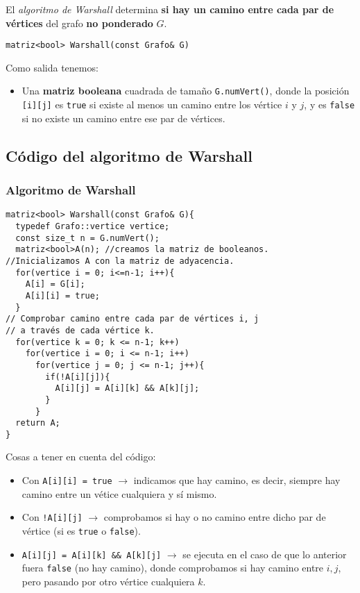 El \textit{algoritmo de Warshall} determina \textbf{si hay un camino entre cada par de vértices} del grafo \textbf{no ponderado} \(G\).

\begin{verbatim}
matriz<bool> Warshall(const Grafo& G)
\end{verbatim}
Como salida tenemos:
\begin{itemize}
  \item Una \textbf{matriz booleana} cuadrada de tamaño \texttt{G.numVert()}, donde la posición \texttt{[i][j]} es \texttt{true} si existe al menos un camino entre los vértice \(i\) y \(j\), y es \texttt{false} si no existe un camino entre ese par de vértices.
\end{itemize}

\subsection{Código del algoritmo de Warshall}
\subsubsection{Algoritmo de Warshall}
\begin{verbatim}
matriz<bool> Warshall(const Grafo& G){
  typedef Grafo::vertice vertice;
  const size_t n = G.numVert();
  matriz<bool>A(n); //creamos la matriz de booleanos.
//Inicializamos A con la matriz de adyacencia.
  for(vertice i = 0; i<=n-1; i++){
    A[i] = G[i];
    A[i][i] = true;
  }
// Comprobar camino entre cada par de vértices i, j
// a través de cada vértice k.
  for(vertice k = 0; k <= n-1; k++)
    for(vertice i = 0; i <= n-1; i++)
      for(vertice j = 0; j <= n-1; j++){
        if(!A[i][j]){
          A[i][j] = A[i][k] && A[k][j];
        }
      }
  return A;
}
\end{verbatim}

Cosas a tener en cuenta del código:
\begin{itemize}
  \item Con \texttt{A[i][i] = true} \(\rightarrow\) indicamos que hay camino, es decir, siempre hay camino entre un vétice cualquiera y sí mismo.
  \item Con \texttt{!A[i][j]} \(\rightarrow\) comprobamos si hay o no camino entre dicho par de vértice (si es \texttt{true} o \texttt{false}).
  \item \texttt{A[i][j] = A[i][k] \&\& A[k][j]} \(\rightarrow\) se ejecuta en el caso de que lo anterior fuera \texttt{false} (no hay camino), donde comprobamos si hay camino entre \(i, j\), pero pasando por otro vértice cualquiera \(k\).
\end{itemize}
